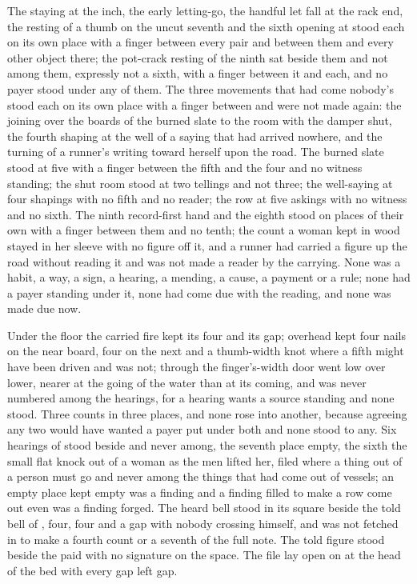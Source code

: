 The staying at the inch, the early letting-go, the handful let fall at the rack end, the resting of a thumb on the uncut seventh and the sixth opening at  stood each on its own place with a finger between every pair and between them and every other object there; the pot-crack resting of the ninth sat beside them and not among them, expressly not a sixth, with a finger between it and each, and no payer stood under any of them. The three movements that had come nobody's stood each on its own place with a finger between and were not made again: the joining over the boards of the burned slate to the room with the damper shut, the fourth shaping at the well of a saying that had arrived nowhere, and the turning of a runner's writing toward herself upon the road. The burned slate stood at five with a finger between the fifth and the four and no witness standing; the shut room stood at two tellings and not three; the well-saying at four shapings with no fifth and no reader; the row at five askings with no witness and no sixth. The ninth record-first hand and the eighth stood on places of their own with a finger between them and no tenth; the count a woman kept in wood stayed in her sleeve with no figure off it, and a runner had carried a figure up the road without reading it and was not made a reader by the carrying. None was a habit, a way, a sign, a hearing, a mending, a cause, a payment or a rule; none had a payer standing under it, none had come due with the reading, and none was made due now.

Under the floor the carried fire kept its four and its gap; overhead  kept four nails on the near board, four on the next and a thumb-width knot where a fifth might have been driven and was not; through the finger's-width door  went low over lower, nearer at the going of the water than at its coming, and was never numbered among the hearings, for a hearing wants a source standing and none stood. Three counts in three places, and none rose into another, because agreeing any two would have wanted a payer put under both and none stood to any. Six hearings of  stood beside and never among, the seventh place empty, the sixth the small flat knock out of a woman as the men lifted her, filed where a thing out of a person must go and never among the things that had come out of vessels; an empty place kept empty was a finding and a finding filled to make a row come out even was a finding forged. The heard bell stood in its square beside the told bell of , four, four and a gap with nobody crossing himself, and was not fetched in to make a fourth count or a seventh of the full note. The told figure stood beside the paid with no signature on the space. The file lay open on  at the head of the bed with every gap left gap.

